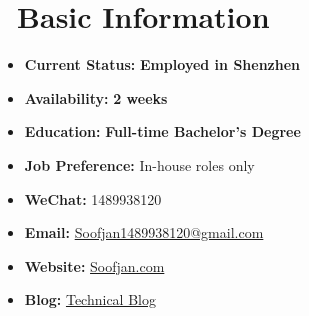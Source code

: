 \documentclass{styles/resume}
\begin{document}


\section{\faInfoCircle\ Basic Information}
\vspace{0.5ex}
\begin{minipage}[t]{0.48\textwidth}
\begin{itemize}[label=,leftmargin=*]
\large
\item \textbf{Current Status:} \textbf{Employed in Shenzhen}
\item \textbf{Availability:} \textbf{2 weeks}
\item \textbf{Education:} \textbf{Full-time Bachelor's Degree}
\item \textbf{Job Preference:} In-house roles only 
\end{itemize}
\end{minipage}\hfill
\begin{minipage}[t]{0.48\textwidth}
\begin{itemize}[label=,leftmargin=*]
\large
\item \textbf{WeChat:} 1489938120
\item \textbf{Email:} \href{mailto:Soofjan1489938120@gmail.com}{Soofjan1489938120@gmail.com}
\item \textbf{Website:} \href{https://Soofjan.com}{Soofjan.com}
\item \textbf{Blog:} \href{https://juejin.cn/user/4074147977125020}{Technical Blog}
\end{itemize}
\end{minipage}
\end{document}

